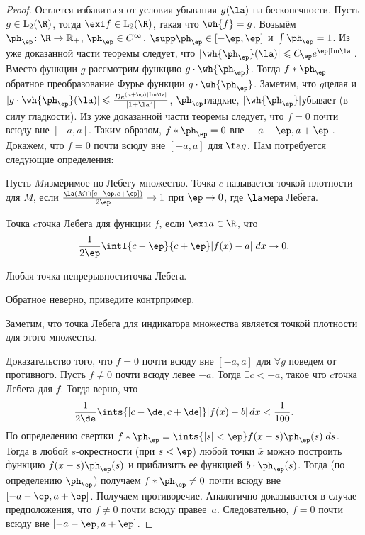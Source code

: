 \documentclass[a4paper]{article}
\newcommand{\dx}{\,dx}
\begin{document}
\begin{proof}
Остается избавиться от условия убывания $g(\la)$ на бесконечности.
Пусть $g\in\mbox{L}_2(\R)$, тогда $\exi f\in\mbox{L}_2(\R )$, такая что $\wh{f}=g$. Возьмём
$\ph_{\ep}\colon \R \rightarrow\mathbb{R_+}$, $\ph_{\ep}\in C^{\infty}$, $\supp \ph_{\ep}\in [-\ep, \ep]$
и~$\int\ph_{\ep}=1$. Из уже доказанной части теоремы следует, что $|\wh{\ph_{\ep}}(\la)|\leqslant C_{\ep}e^{\ep|\mathrm{Im}\la|}$.
Вместо функции $g$ рассмотрим функцию $g\cdot\wh{\ph_{\ep}}$. Тогда $f\ast\ph_{\ep}$\т обратное преобразование Фурье
функции $g\cdot\wh{\ph_{\ep}}$. Заметим, что $g$\т целая и
$|g\cdot\wh{\ph_{\ep}}(\la)|\leqslant\frac{De^{(a+\ep)|\mathrm{Im}\la|}}{|1+\la^2|}$, $\ph_{\ep}$\т гладкие,
$|\wh{\ph_{\ep}}|$\т убывает (в силу гладкости). Из уже доказанной части теоремы следует, что $f=0$ почти всюду вне $[-a,a]$.
Таким образом, $f\ast\ph_{\ep} = 0$ вне $[-a-\ep, a+\ep]$. Докажем, что $f=0$ почти всюду вне $[-a,a]$ для $\fa g$.
Нам потребуется следующие определения:
\begin{df}
Пусть $M$\т измеримое по Лебегу множество. Точка $c$ называется точкой плотности для $M$, если
$\frac{\la(M\cap [c-\ep, c+\ep])}{2\ep}\rightarrow 1$ при $\ep\rightarrow 0$, где $\la$\т мера Лебега.
\end{df}
\begin{df}
Точка $c$\т точка Лебега для функции $f$, если $\exi a\in\R $, что
$$\frac{1}{2\ep}\intl{c-\ep}{c+\ep}|f(x)-a|\; dx \rightarrow 0.$$
\end{df}
\begin{ex}
Любая точка непрерывности\т точка Лебега.
\end{ex}
\begin{problem}
Обратное неверно, приведите контрпример.
\end{problem}
\begin{note}
Заметим, что точка Лебега для индикатора множества является точкой плотности для этого множества.
\end{note}
Доказательство того, что $f=0$ почти всюду вне $[-a,a]$ для $\forall g$ поведем от противного.
Пусть $f \ne 0$ почти всюду левее $-a$. Тогда $\exi c < -a$, такое что $c$\т точка Лебега для $f$.
Тогда верно, что
$$\frac{1}{2\de}\ints{[c-\de,c+\de]}|f(x)-b|\dx < \frac{1}{100}.$$
По определению свертки $f\ast\ph_{\ep} = \ints{|s|<\ep}f(x-s)\ph_{\ep}(s)\; ds$.
Тогда в любой $s$-окрестности (при $s<\ep$) любой точки $\overline{x}$ можно построить функцию
$f(x-s)\ph_{\ep}(s)$ и приблизить ее функцией $b\cdot\ph_{\ep}(s)$. Тогда (по определению $\ph_{\ep}$)
получаем $f\ast\ph_{\ep}\ne 0$ почти всюду вне $[-a-\ep, a+\ep]$. Получаем противоречие.
Аналогично доказывается в случае предположения, что $f \ne 0$ почти всюду правее~$a$.
Следовательно, $f=0$ почти всюду вне $[-a-\ep, a+\ep]$.
\end{proof}
\end{document}
